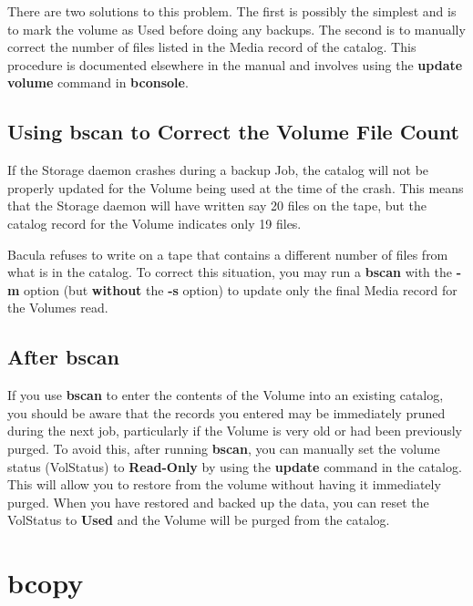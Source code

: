 There are two solutions to this problem. The first is possibly the simplest
and is to mark the volume as Used before doing any backups.  The second is
to manually correct the number of files listed in the Media record of the
catalog.  This procedure is documented elsewhere in the manual and involves
using the {\bf update volume} command in {\bf bconsole}.

\subsection{Using bscan to Correct the Volume File Count}

If the Storage daemon crashes during a backup Job, the catalog will not be
properly updated for the Volume being used at the time of the crash. This
means that the Storage daemon will have written say 20 files on the tape, but
the catalog record for the Volume indicates only 19 files.

Bacula refuses to write on a tape that contains a different number of files
from what is in the catalog. To correct this situation, you may run a {\bf
bscan} with the {\bf -m} option (but {\bf without} the {\bf -s} option) to
update only the final Media record for the Volumes read.

\subsection{After bscan}

If you use {\bf bscan} to enter the contents of the Volume into an existing
catalog, you should be aware that the records you entered may be immediately
pruned during the next job, particularly if the Volume is very old or had been
previously purged. To avoid this, after running {\bf bscan}, you can manually
set the volume status (VolStatus) to {\bf Read-Only} by using the {\bf update}
command in the catalog. This will allow you to restore from the volume without
having it immediately purged. When you have restored and backed up the data,
you can reset the VolStatus to {\bf Used} and the Volume will be purged from
the catalog.

\section{bcopy}
\label{bcopy}

